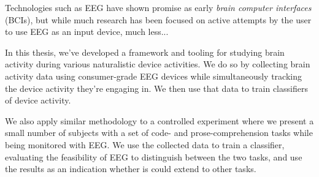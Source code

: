 
Technologies such as EEG have shown promise as early \emph{brain computer interfaces} (BCIs), but while much research has been focused on active attempts by the user to use EEG as an input device, much less...



In this thesis, we've developed a framework and tooling for studying brain activity during various naturalistic device activities. We do so by collecting brain activity data using consumer-grade EEG devices while simultaneously tracking the device activity they're engaging in. We then use that data to train classifiers of device activity.

We also apply similar methodology to a controlled experiment where we present a small number of subjects with a set of code- and prose-comprehension tasks while being monitored with EEG\@. We use the collected data to train a classifier, evaluating the feasibility of EEG to distinguish between the two tasks, and use the results as an indication whether is could extend to other tasks.
